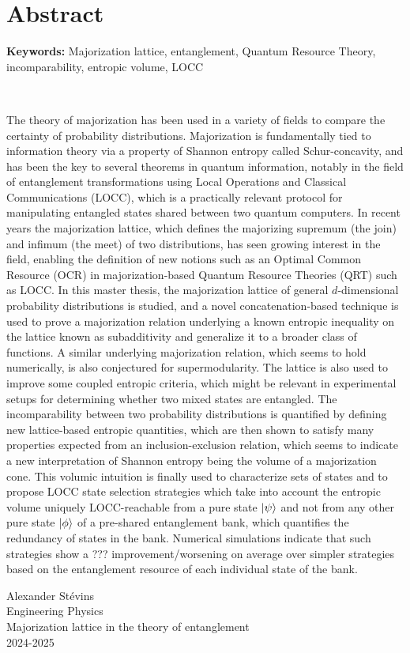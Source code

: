 \section*{Abstract}


\textbf{Keywords:} Majorization lattice, entanglement, Quantum Resource Theory, incomparability, entropic volume, LOCC

~

The theory of majorization has been used in a variety of fields to compare the certainty of probability distributions. Majorization is fundamentally tied to information theory via a property of Shannon entropy called Schur-concavity, and has been the key to several theorems in quantum information, notably in the field of entanglement transformations using Local Operations and Classical Communications (LOCC), which is a practically relevant protocol for manipulating entangled states shared between two quantum computers. In recent years the majorization lattice, which defines the majorizing supremum (the join) and infimum (the meet) of two distributions, has seen growing interest in the field, enabling the definition of new notions such as an Optimal Common Resource (OCR) in majorization-based Quantum Resource Theories (QRT) such as LOCC. In this master thesis, the majorization lattice of general $d$-dimensional probability distributions is studied, and a novel concatenation-based technique is used to prove a majorization relation underlying a known entropic inequality on the lattice known as subadditivity and generalize it to a broader class of functions. A similar underlying majorization relation, which seems to hold numerically, is also conjectured for supermodularity. The lattice is also used to improve some coupled entropic criteria, which might be relevant in experimental setups for determining whether two mixed states are entangled. The incomparability between two probability distributions is quantified by defining new lattice-based entropic quantities, which are then shown to satisfy many properties expected from an inclusion-exclusion relation, which seems to indicate a new interpretation of Shannon entropy being the volume of a majorization cone. This volumic intuition is finally used to characterize sets of states and to propose LOCC state selection strategies which take into account the entropic volume uniquely LOCC-reachable from a pure state $\ket{\psi}$ and not from any other pure state $\ket{\phi}$ of a pre-shared entanglement bank, which quantifies the redundancy of states in the bank. Numerical simulations indicate that such strategies show a ??? improvement/worsening on average over simpler strategies based on the entanglement resource of each individual state of the bank.

\vspace*{\fill}
\noindent Alexander Stévins\\
Engineering Physics\\
Majorization lattice in the theory of entanglement\\
2024-2025
